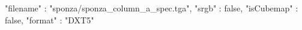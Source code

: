 { 
	"filename" : "sponza/sponza_column_a_spec.tga", 
	"srgb" : false,
	"isCubemap" : false,
	"format" : "DXT5"
}